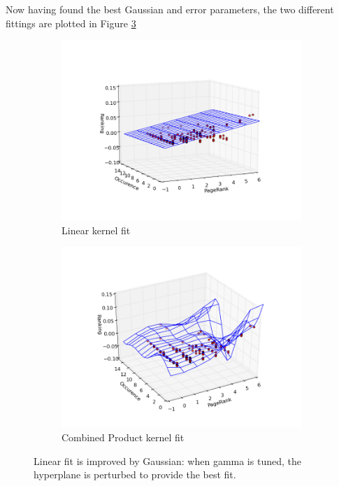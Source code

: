 \documentclass[12pt,notitlepage,twoside]{scrreprt}
\begin{document}
Now having found the best Gaussian and error parameters, the two different fittings are
plotted in Figure \ref{fits}

\begin{figure}[h]
\centering
\begin{subfigure}[b]{.49\textwidth}
  \centering
  \includegraphics[width=\linewidth]{figs/lin_fit.png}
  \caption{Linear kernel fit\label{coarse}}
\end{subfigure}
\begin{subfigure}[b]{.49\textwidth}
  \centering
  \includegraphics[width=\linewidth]{figs/perf_fit.png}
  \caption{Combined Product kernel fit\label{fine}}
\end{subfigure}
\caption{Linear fit is improved by Gaussian: when gamma is tuned, the hyperplane is
	perturbed to provide the best fit.\label{fits}}
\end{figure}
\end{document}
